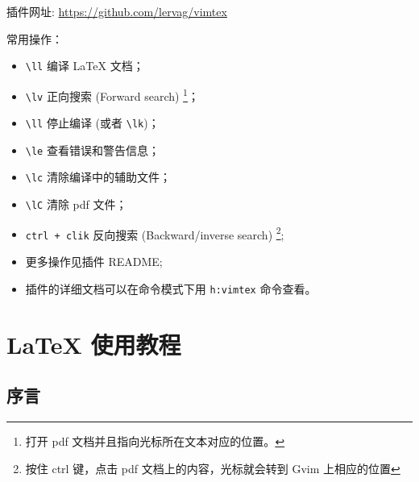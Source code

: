 \documentclass[
    11pt,
    cite=authoryear,
    device=normal,
    lang=cn,
    mode=simple,
    result=answer,
    toc=onecol,
]{elegantbook_sierxue}
\begin{document}
插件网址:
\href{https://github.com/lervag/vimtex}{https://github.com/lervag/vimtex}

常用操作：
\begin{itemize}
    \item \lstinline{\ll} 编译 \LaTeX{} 文档；
    \item \lstinline{\lv} 正向搜索 (Forward search)
        \footnote{打开 pdf 文档并且指向光标所在文本对应的位置。}；
    \item \lstinline{\ll} 停止编译 (或者 \lstinline{\lk})；
    \item \lstinline{\le} 查看错误和警告信息；
    \item \lstinline{\lc} 清除编译中的辅助文件；
    \item \lstinline{\lC} 清除 pdf 文件；
    \item \lstinline{ctrl + clik} 反向搜索 (Backward/inverse search)
        \footnote{按住 ctrl 键，点击 pdf 文档上的内容，光标就会转到 Gvim
        上相应的位置};
    \item 更多操作见插件 README;
    \item 插件的详细文档可以在命令模式下用 \lstinline{h:vimtex} 命令查看。
\end{itemize}


%

\chapter{\LaTeX{} 使用教程}%
\label{cha:latex-tips}

\section*{序言}%
\label{sec:latex-intro}
\end{document}
